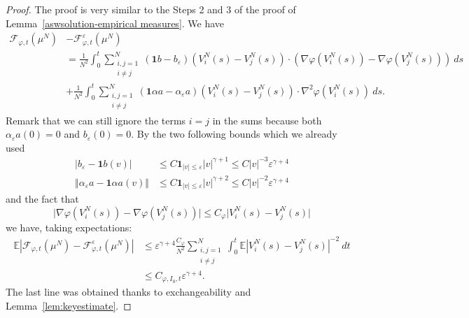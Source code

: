 \documentclass[11pt,a4paper]{article}
\theoremstyle{definition}
\theoremstyle{plain}
\begin{document}
\begin{proof}
    The proof is very similar to the Steps 2 and 3 of the proof of Lemma~\ref{aswsolution-empirical measures}. We have
    \begin{align*}
        \mathcal{F}_{\varphi,t}(\mu^N)&-\mathcal{F}^\varepsilon_{\varphi,t}(\mu^N)\\
        &=
    \frac{1}{N^2}\int_0^t \sum_{\substack{i,j=1\\ i\neq j}}^N (\mathbf{1}b - b_\varepsilon)(V^N_i(s)-V^N_j(s)) \cdot (\nabla\varphi(V^N_i(s))-\nabla\varphi(V^N_j(s)))\ ds\\
    &+\frac{1}{N^2} \int_0^t \sum_{\substack{i,j=1\\ i\neq j}}^N (\mathbf{1}\alpha a - \alpha_\varepsilon a)(V^N_i(s)-V^N_j(s)) \cdot \nabla^2\varphi(V^N_i(s))\ ds.
    \end{align*}
    Remark that we can still ignore the terms $i=j$ in the sums because both $\alpha_\varepsilon a(0)=0$ and $b_\varepsilon(0)=0$.
    By the two following bounds which we already used
    \begin{align*}
    \vert b_\varepsilon - \mathbf{1}b(v)\vert &\leq C \mathbf{1}_{\vert v \vert \leq \varepsilon}\vert v \vert^{\gamma + 1}  \leq C \vert v \vert^{-3} \varepsilon^{\gamma+4}\\
    \Vert \alpha_\varepsilon a - \mathbf{1}\alpha a(v)\Vert &\leq C \mathbf{1}_{\vert v \vert \leq \varepsilon}\vert v \vert^{\gamma + 2}  \leq C \vert v \vert^{-2}  \varepsilon^{\gamma+4}
    \end{align*}
    and the fact that
    $$\vert \nabla\varphi(V^N_i(s))-\nabla\varphi(V^N_j(s))\vert\leq C_\varphi \vert V^N_i(s)-V^N_j(s)\vert$$
    we have, taking expectations:
    \begin{align*}
        \mathbb{E} \left\vert\mathcal{F}_{\varphi,t}(\mu^N)-\mathcal{F}_{\varphi,t}^\varepsilon(\mu^N) \right\vert &\leq
    \varepsilon^{\gamma+4}\frac{C_\varphi}{N^2}\sum_{\substack{i,j=1\\ i\neq j}}^N\int_0^t  \mathbb{E}\left\vert V^N_i(s)-V^N_j(s) \right\vert^{-2}\ dt\\
    &\leq C_{\varphi,I_0,t} \varepsilon^{\gamma+4}.
    \end{align*}
    The last line was obtained thanks to exchangeability and Lemma~\ref{lem:keyestimate}.
\end{proof}
\end{document}
